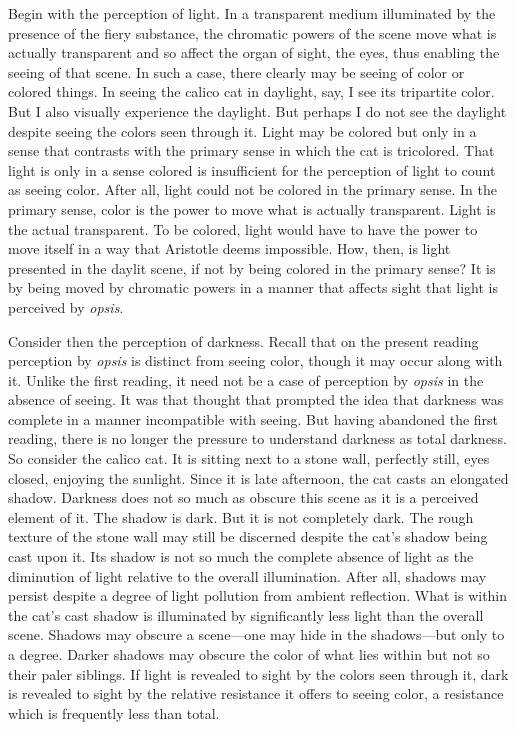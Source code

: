 Begin with the perception of light. In a transparent medium illuminated by the presence of the fiery substance, the chromatic powers of the scene move what is actually transparent and so affect the organ of sight, the eyes, thus enabling the seeing of that scene. In such a case, there clearly may be seeing of color or colored things. In seeing the calico cat in daylight, say, I see its tripartite color. But I also visually experience the daylight. But perhaps I do not see the daylight despite seeing the colors seen through it. Light may be colored but only in a sense that contrasts with the primary sense in which the cat is tricolored. That light is only in a sense colored is insufficient for the perception of light to count as seeing color. After all, light could not be colored in the primary sense. In the primary sense, color is the power to move what is actually transparent. Light is the actual transparent. To be colored, light would have to have the power to move itself in a way that Aristotle deems impossible. How, then, is light presented in the daylit scene, if not by being colored in the primary sense? It is by being moved by chromatic powers in a manner that affects sight that light is perceived by \emph{opsis}.

Consider then the perception of darkness. Recall that on the present reading perception by \emph{opsis} is distinct from seeing color, though it may occur along with it. Unlike the first reading, it need not be a case of perception by \emph{opsis} in the absence of seeing. It was that thought that prompted the idea that darkness was complete in a manner incompatible with seeing. But having abandoned the first reading, there is no longer the pressure to understand darkness as total darkness. So consider the calico cat. It is sitting next to a stone wall, perfectly still, eyes closed, enjoying the sunlight. Since it is late afternoon, the cat casts an elongated shadow. Darkness does not so much as obscure this scene as it is a perceived element of it. The shadow is dark. But it is not completely dark. The rough texture of the stone wall may still be discerned despite the cat's shadow being cast upon it. Its shadow is not so much the complete absence of light as the diminution of light relative to the overall illumination. After all, shadows may persist despite a degree of light pollution from ambient reflection. What is within the cat's cast shadow is illuminated by significantly less light than the overall scene. Shadows may obscure a scene—one may hide in the shadows—but only to a degree. Darker shadows may obscure the color of what lies within but not so their paler siblings. If light is revealed to sight by the colors seen through it, dark is revealed to sight by the relative resistance it offers to seeing color, a resistance which is frequently less than total.

